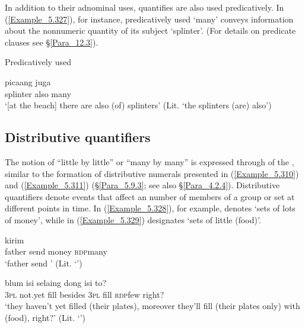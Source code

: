 In addition to their adnominal uses, quantifies are also used predicatively. In (\ref{Example_5.327}), for instance, predicatively used  ‘many’ conveys information about the nonnumeric quantity of its subject  ‘splinter’. (For details on  predicate clauses see §\ref{Para_12.3}).


\begin{styleExampleTitle}
Predicatively used 
\end{styleExampleTitle}

\ea
\label{Example_5.327}
\gll {{\ldots}} {picaang} {juga} {}\\ %
  { }  splinter  also  many\\
\glt
‘[at the beach] there are also (of) splinters’ (Lit. ‘the splinters (are) also’) \textstyleExampleSource{[080917-006-CvHt.0008]}
\z


\subsection{Distributive quantifiers}
\label{Para_5.10.2}
The notion of ``little by little'' or ``many by many'' is expressed through  of the , similar to the formation of distributive numerals presented in (\ref{Example_5.310}) and (\ref{Example_5.311}) (§\ref{Para_5.9.3}; see also §\ref{Para_4.2.4}). Distributive quantifiers denote events that affect an  number of members of a group or set at different points in time. In (\ref{Example_5.328}), for example,  denotes ‘sets of lots of money’, while in (\ref{Example_5.329})  designates ‘sets of little (food)’.


\ea
\label{Example_5.328}
 {kirim} {} {}\\ %
 father  send  money  \textsc{rdp}{\Tilde}many\\
 ‘father send ’ (Lit. ‘’) \textstyleExampleSource{[080922-001a-CvPh.0440]}
\z

\ea
\label{Example_5.329}
 {blum} {isi} {selaing} {dong} {isi} {} {to?}\\ %
 \textsc{3pl}  not.yet  fill  besides  \textsc{3pl}  fill  \textsc{rdp}{\Tilde}few  right?\\
 ‘they haven’t yet filled (their plates), moreover they’ll fill (their plates only) with  (food), right?’ (Lit. ‘’) \textstyleExampleSource{[081025-009a-Cv.0081]}
\z


